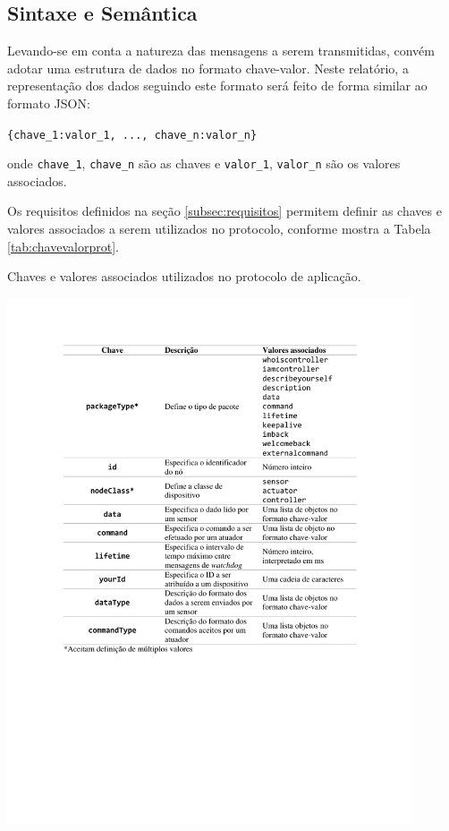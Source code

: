 \subsection{Sintaxe e Semântica} \label{subsec:sintaxe}
Levando-se em conta a natureza das mensagens a serem transmitidas, convém adotar uma estrutura de dados no formato chave-valor. Neste relatório, a representação dos dados seguindo este formato será feito de forma similar ao formato JSON:
\begin{center}
	\texttt{\{chave\_1:valor\_1, ..., chave\_n:valor\_n\}}
\end{center}
onde \texttt{chave\_1}, \texttt{chave\_n} são as chaves e \texttt{valor\_1}, \texttt{valor\_n} são os valores associados.

Os requisitos definidos na seção \ref{subsec:requisitos} permitem definir as chaves e valores associados a serem utilizados no protocolo, conforme mostra a Tabela \ref{tab:chavevalorprot}.

\begin{table}[h]
	\centering
	\caption{Chaves e valores associados utilizados no protocolo de aplicação.}\smallskip
	\label{tab:chavevalorprot}
	\includegraphics[width=0.9\textwidth]{tabelas/chave_valor_prot.pdf}
\end{table}

